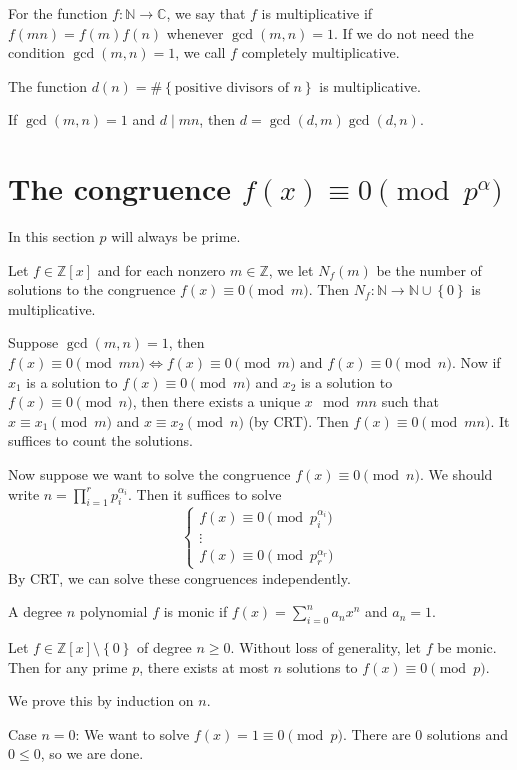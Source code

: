 \documentclass[11pt]{article}
\theoremstyle{definition}
\newcommand{\The}[2]{\begin{#1}#2\end{#1}}
\newcommand{\sm}[0]{\setminus}
\newcommand{\set}[1]{\left\{ #1 \right\}}
\newcommand{\nl}[0]{\vspace{12pt}}
\newcommand{\et}[0]{\text{ and }}
\newcommand{\ZZ}{\mathbb{Z}}
\newcommand{\NN}{\mathbb{N}}
\newcommand{\CC}{\mathbb{C}}
\begin{document}
\The{defn} {
	For the function $f:\NN\to\CC$, we say that $f$ is {multiplicative} if $f(mn) = f(m)f(n)$ whenever $\gcd(m,n)=1$. 
	If we do not need the condition $\gcd(m,n)=1$, we call $f$ {completely multiplicative}. 
}

\The{prop} {
	The function $d(n) = \#\set{\text{positive divisors of } n}$ is multiplicative. 
}
\proof
	If $\gcd(m,n)=1$ and $d\mid mn$, then $d = \gcd(d,m) \gcd(d,n)$. 
\qedhere


\section{The congruence $f(x) \equiv 0 \pmod{p^\alpha}$}

In this section $p$ will always be prime.

\The{prop} { 
	Let $f\in\ZZ[x]$ and for each nonzero $m\in\ZZ$, we let $N_f(m)$ be the number of solutions to the congruence $f(x)\equiv 0\pmod{m}$. Then $N_f:\NN \to \NN\cup\set{0}$ is multiplicative. 
}
\proof Suppose $\gcd(m,n)=1$, then $f(x)\equiv 0 \pmod{mn} \iff f(x)\equiv0 \pmod{m} \et f(x)\equiv0 \pmod{n}$. 
Now if $x_1$ is a solution to $f(x)\equiv0 \pmod{m}$ and $x_2$ is a solution to $f(x)\equiv0 \pmod{n}$, then there exists a unique $x \mod mn$ such that $x\equiv x_1 \pmod{m}$ and $x\equiv x_2 \pmod{n}$ (by CRT). 
Then $f(x) \equiv 0 \pmod{mn}$. It suffices to count the solutions.
\qedhere

\nl
Now suppose we want to solve the congruence $f(x)\equiv 0 \pmod{n}$. We should write $n=\prod_{i=1}^{r}p_i^{\alpha_i}$. Then it suffices to solve 
$$ \begin{cases}f(x)\equiv0 \pmod{p_i^{\alpha_i}} \\ \vdots \\ f(x)\equiv0 \pmod{p_r^{\alpha_r}} \end{cases} $$
By CRT, we can solve these congruences independently. 

\The{defn} {
	A degree $n$ polynomial $f$ is monic if $f(x) = \sum_{i=0}^{n} a_nx^n$ and $a_n=1$. 
}
\The{prop} {
	Let $f\in\ZZ[x]\sm\set{0}$ of degree $n\ge0$. Without loss of generality, let $f$ be monic. Then for any prime $p$, there exists at most $n$ solutions to $f(x)\equiv 0 \pmod{p}$. 
}
\proof
We prove this by induction on $n$.

Case $n=0$: We want to solve $f(x)=1\equiv0 \pmod{p}$. There are 0 solutions and $0\le 0$, so we are done.
\end{document}
